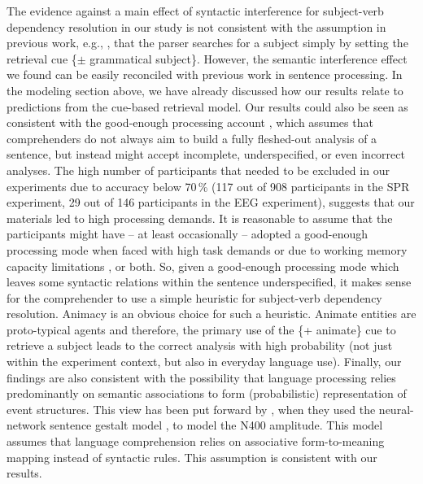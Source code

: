 \documentclass[a4paper, man, floatsintext]{apa7}
\begin{document}
The evidence against a main effect of syntactic interference for subject-verb dependency resolution in our study is not consistent with the assumption in previous work, e.g., \textcite{vandyke07,mertzen}, that the parser searches for a subject simply by setting the retrieval cue \{$\pm$ grammatical subject\}.
  However, the semantic interference effect we found can be easily reconciled with previous work in  sentence processing. In the modeling section above, we have already discussed how our results relate to predictions from the \citet{Lewis2005} cue-based retrieval model.  
 Our results could also be seen as consistent with the good-enough processing account \citep{ferreira2007goodenough}, which assumes that comprehenders do not always aim to build a fully fleshed-out analysis of a sentence, but instead might accept incomplete, underspecified, or even incorrect analyses. The high number of participants that needed to be excluded in our experiments due to accuracy below 70\,\% (117 out of 908 participants in the SPR experiment, 29 out of 146 participants in the EEG experiment), suggests that our materials led to high processing demands. It is reasonable to assume that the participants might have -- at least occasionally -- adopted a good-enough processing mode when faced with high task demands \parencite{swets2008underspecification,LogacevMultiple,LogacevVasishthQJEP2016} or due to working memory capacity limitations \parencite{MalsburgVasishth2013}, or both. So, given a good-enough processing mode which leaves some syntactic relations within the sentence underspecified, it makes sense for the comprehender to use a simple heuristic for subject-verb dependency resolution. Animacy is an obvious choice for such a heuristic. Animate entities are proto-typical agents \citep{dowty1991thematic} and therefore, the primary use of the \{+ animate\} cue to retrieve a subject leads to the correct analysis with high probability (not just within the experiment context, but also in everyday language use). Finally, our findings are also consistent with the possibility that language processing relies predominantly on semantic associations to form (probabilistic)
representation of event structures. This view has been put forward by \textcite{rabovsky_etal_2018}, when they used the neural-network sentence gestalt model \parencite{mcclelland1989_sentence_gestalt}, to model the N400 amplitude. This model assumes that language comprehension relies on associative form-to-meaning mapping instead of syntactic rules. This assumption is consistent with our results.
\end{document}
